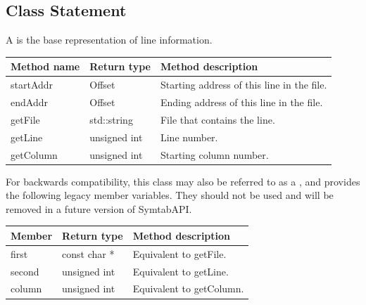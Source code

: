 \subsection{Class Statement}
\label{Statement}


A  is the base representation of line information.

\begin{tabularx}{\textwidth}{llX}
\toprule
Method name & Return type & Method description \\
\midrule
startAddr & Offset & Starting address of this line in the file. \\
endAddr & Offset & Ending address of this line in the file. \\
getFile & std::string & File that contains the line.   \\
getLine & unsigned int & Line number. \\
getColumn & unsigned int & Starting column number. \\
\bottomrule
\end{tabularx}

For backwards compatibility, this class may also be referred to as a , and provides the following legacy member variables. They should not be used and will be removed in a future version of SymtabAPI.

\begin{tabularx}{\textwidth}{llX}
\toprule
Member & Return type & Method description \\
\midrule
first & const char * & Equivalent to getFile. \\
second & unsigned int & Equivalent to getLine. \\
column & unsigned int & Equivalent to getColumn. \\
\bottomrule
\end{tabularx}
